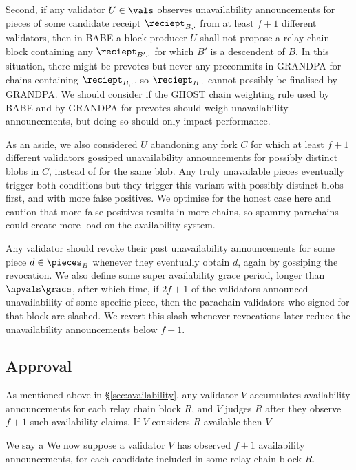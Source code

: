 Second, if any validator $U \in \vals$ observes unavailability announcements for pieces of some candidate receipt $\reciept_{B,\cdot}$ from at least $f+1$ different validators, then in BABE a block producer $U$ shall not propose a relay chain block containing any $\reciept_{B',\cdot}$ for which $B'$ is a descendent of $B$.
In this situation, there might be prevotes but never any precommits in GRANDPA for chains containing  $\reciept_{B,\cdot}$, so $\reciept_{B,\cdot}$ cannot possibly be finalised by GRANDPA.  We should consider if the GHOST chain weighting rule used by BABE and by GRANDPA for prevotes should weigh unavailability announcements, but doing so should only impact performance.

As an aside, we also considered $U$ abandoning any fork $C$ for which at least $f+1$ different validators gossiped unavailability announcements for possibly distinct blobs in $C$, instead of for the same blob.  Any truly unavailable pieces eventually trigger both conditions but they trigger this variant with possibly distinct blobs first, and with more false positives.  We optimise for the honest case here and caution that more false positives results in more chains, so spammy parachains could create more load on the availability system.

Any validator should revoke their past unavailability announcements for some piece $d \in \pieces_B$ whenever they eventually obtain $d$, again by gossiping the revocation.  We also define some super availability grace period, longer than $\npvals \grace$, after which time, if $2 f + 1$ of the validators announced unavailability of some specific piece, then the parachain validators who signed for that block are slashed.
We revert this slash whenever revocations later reduce the unavailability announcements below $f+1$.


\subsection{Approval}
\label{sec:approval}

As mentioned above in \S\ref{sec:availability}, any validator $V$ accumulates availability announcements for each relay chain block $R$, and $V$ judges $R$ after they observe $f+1$ such availability claims.  If $V$ considers $R$ available then $V$ 

We say a
We now suppose a validator $V$ has observed $f+1$ availability announcements,  for each candidate included in some relay chain block $R$.





